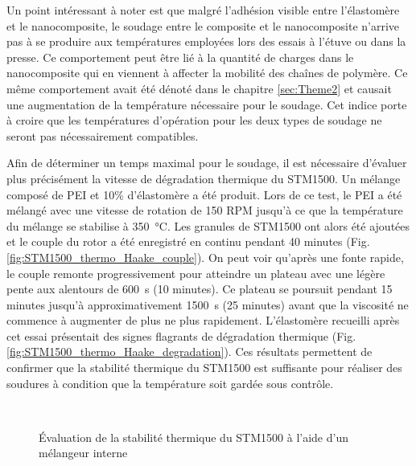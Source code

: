 Un point intéressant à noter est que malgré l'adhésion visible entre l'élastomère et le nanocomposite, le soudage entre le composite et le nanocomposite n'arrive pas à se produire aux températures employées lors des essais à l'étuve ou dans la presse. 
Ce comportement peut être lié à la quantité de charges dans le nanocomposite qui en viennent à affecter la mobilité des chaînes de polymère. 
Ce même comportement avait été dénoté dans le chapitre \ref{sec:Theme2} et causait une augmentation de la température nécessaire pour le soudage. 
Cet indice porte à croire que les températures d'opération pour les deux types de soudage ne seront pas nécessairement compatibles. 
\clearpage

Afin de déterminer un temps maximal pour le soudage, il est nécessaire d'évaluer plus précisément la vitesse de dégradation thermique du STM1500. 
Un mélange composé de PEI et 10\% d'élastomère a été produit. 
Lors de ce test, le PEI a été mélangé avec une vitesse de rotation de 150 RPM jusqu'à ce que la température du mélange se stabilise à \SI{350}{\celsius}. 
Les granules de STM1500 ont alors été ajoutées et le couple du rotor a été enregistré en continu pendant 40 minutes (Fig. \ref{fig:STM1500_thermo_Haake_couple}). 
On peut voir qu'après une fonte rapide, le couple remonte progressivement pour atteindre un plateau avec une légère pente aux alentours de \SI{600}{\second} (10 minutes). 
Ce plateau se poursuit pendant 15 minutes jusqu'à approximativement \SI{1500}{\second} (25 minutes) avant que la viscosité ne commence à augmenter de plus ne plus rapidement. 
L'élastomère recueilli après cet essai présentait des signes flagrants de dégradation thermique (Fig. \ref{fig:STM1500_thermo_Haake_degradation}). 
Ces résultats permettent de confirmer que la stabilité thermique du STM1500 est suffisante pour réaliser des soudures à condition que la température soit gardée sous contrôle. 

\begin{figure}[h]	
	\centering
	 \qquad
	 \\
	\caption{Évaluation de la stabilité thermique du STM1500 à l'aide d'un mélangeur interne}
	\label{fig:STM1500_thermo_Haake}
\end{figure}

